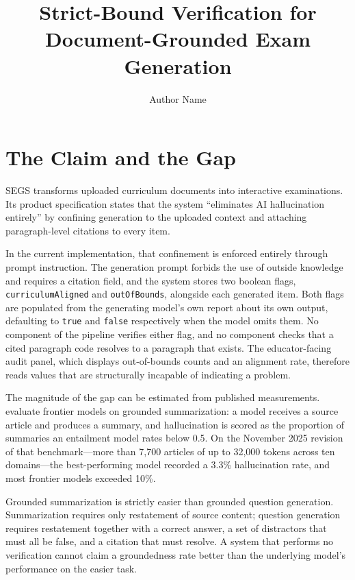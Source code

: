\documentclass[stu,11pt,floatsintext]{apa7}
\title{Strict-Bound Verification for Document-Grounded Exam Generation}
\author{Author Name}                                    %
\affiliation{Department, University}                    %
\begin{document}
\maketitle

\section{The Claim and the Gap}

SEGS transforms uploaded curriculum documents into interactive examinations. Its
product specification states that the system ``eliminates AI hallucination
entirely'' by confining generation to the uploaded context and attaching
paragraph-level citations to every item.

In the current implementation, that confinement is enforced entirely through
prompt instruction. The generation prompt forbids the use of outside knowledge
and requires a citation field, and the system stores two boolean flags,
\texttt{curriculumAligned} and \texttt{outOfBounds}, alongside each generated
item. Both flags are populated from the generating model's own report about its
own output, defaulting to \texttt{true} and \texttt{false} respectively when the
model omits them. No component of the pipeline verifies either flag, and no
component checks that a cited paragraph code resolves to a paragraph that
exists. The educator-facing audit panel, which displays out-of-bounds counts and
an alignment rate, therefore reads values that are structurally incapable of
indicating a problem.

The magnitude of the gap can be estimated from published measurements.
\textcite{vectara2025leaderboard} evaluate frontier models on grounded
summarization: a model receives a source article and produces a summary, and
hallucination is scored as the proportion of summaries an entailment model rates
below 0.5. On the November 2025 revision of that benchmark---more than 7,700
articles of up to 32,000 tokens across ten domains---the best-performing model
recorded a 3.3\% hallucination rate, and most frontier models exceeded 10\%.

Grounded summarization is strictly easier than grounded question generation.
Summarization requires only restatement of source content; question generation
requires restatement together with a correct answer, a set of distractors that
must all be false, and a citation that must resolve. A system that performs no
verification cannot claim a groundedness rate better than the underlying model's
performance on the easier task.
\end{document}
